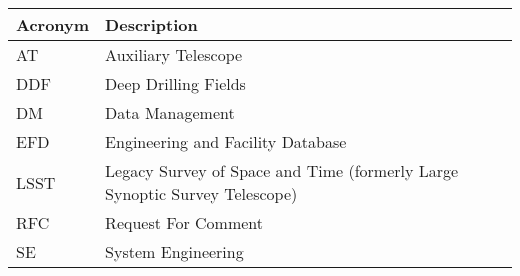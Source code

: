 \addtocounter{table}{-1}
\begin{longtable}{p{}p{}}\hline
\textbf{Acronym} & \textbf{Description}  \\\hline

AT & Auxiliary Telescope \\\hline
DDF & Deep Drilling Fields \\\hline
DM & Data Management \\\hline
EFD & Engineering and Facility Database \\\hline
LSST & Legacy Survey of Space and Time (formerly Large Synoptic Survey Telescope) \\\hline
RFC & Request For Comment \\\hline
SE & System Engineering \\\hline
\end{longtable}

